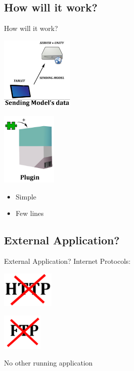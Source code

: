 \documentclass[a4paper,10pt]{beamer}
\begin{document}
		\subsection{How will it work?}
			
			\begin{frame}{How will it work?}
				\begin{multicols}{2}
					\includegraphics[height=100pt]{images/network/sending_model.png}
					\pause
					
					\columnbreak
					\includegraphics[height=100pt]{images/network/plugin.png}
					\begin{itemize}
						\item Simple
						\item Few lines
					\end{itemize}
				\end{multicols}
				
			\end{frame}
			
		\subsection{External Application?}
			
			\begin{frame}{External Application?}
				Internet Protocols:
				
				\begin{multicols}{2}
					\includegraphics[height=50pt]{images/network/nohttp.png}
					
					\columnbreak
					\includegraphics[height=50pt]{images/network/noftp.png}
				\end{multicols}
				
				\pause
				
				No other running application
			\end{frame}
			
\end{document}
